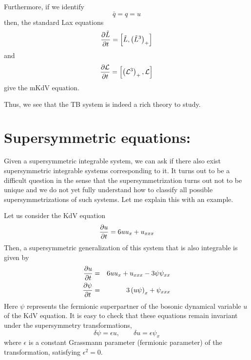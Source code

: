 \documentclass[a4paper,11pt]{article}
\begin{document}
Furthermore, if we identify
\begin{equation}
\bar{q} = q = u
\end{equation}
then, the standard Lax equations
\begin{equation}
{\partial \tilde{L}\over \partial t} =
\left[\tilde{L},\left(\tilde{L}^{3}\right)_{+}\right]
\end{equation}
and
\begin{equation}
{\partial {\cal L}\over \partial t} = \left[\left({\cal
L}^{3}\right)_{+},{\cal L}\right]
\end{equation}
give the mKdV equation.

Thus, we see that the TB system is indeed a rich theory to study.

\section{Supersymmetric equations:}

Given a supersymmetric integrable system, we can ask if there also
exist supersymmetric integrable systems corresponding to it. It turns
out to be a difficult question in the sense that the
supersymmetrization turns out not to be unique and we do not yet fully
understand how to classify all possible supersymmetrizations of such
systems. Let me explain this with an example.

Let us consider the KdV equation
$$
{\partial u\over \partial t} = 6 uu_{x} + u_{xxx}
$$
Then, a supersymmetric generalization of this system that is also
integrable is given by
\begin{eqnarray}
{\partial u\over \partial t} & = & 6 uu_{x} + u_{xxx} - 3 \psi
\psi_{xx}\nonumber\\
{\partial \psi\over \partial t} & = & 3 \left(u\psi\right)_{x} +
\psi_{xxx}
\end{eqnarray}
Here $\psi$ represents the fermionic superpartner of the bosonic
dynamical variable $u$ of the KdV equation. It is easy to check that
these equations remain invariant under the supersymmetry
transformations,
\begin{equation}
\delta \psi = \epsilon u,\qquad \delta u = \epsilon \psi_{x}
\end{equation}
where $\epsilon$ is a constant Grassmann parameter (fermionic
parameter) of the transformation, satisfying $\epsilon^{2} = 0$.
\end{document}
